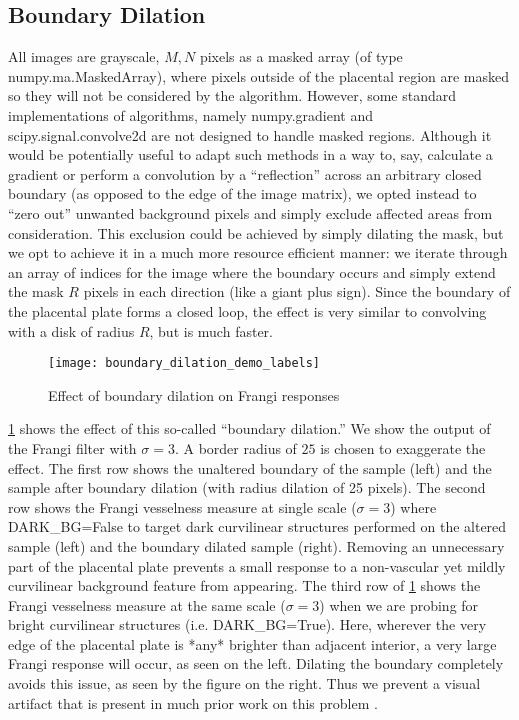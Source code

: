     \subsection{Boundary Dilation} \label{sec:boundary-dilation}
    
    All images are grayscale, $M,N$ pixels as a masked array (of type
    \textrm{numpy.ma.MaskedArray}), where pixels outside of the placental region are masked so they will not be considered by the algorithm. However, some standard
    implementations of algorithms, namely \textrm{numpy.gradient and scipy.signal.convolve2d} are not designed to handle masked regions. Although it would be potentially useful to adapt such methods in a way to, say, calculate a gradient or perform a convolution by a ``reflection'' across an arbitrary closed boundary (as opposed to the edge of the image matrix), we opted instead to ``zero out'' unwanted background pixels and simply exclude affected areas from consideration. This exclusion could be achieved by
    simply dilating the mask, but we opt to achieve it in a much more resource efficient manner: we iterate through an array of indices for the image where the boundary occurs and simply extend the mask $R$ pixels in each direction (like a giant plus sign). Since the boundary of the placental plate forms a closed loop, the effect is very similar to convolving with a disk of radius $R$, but is much faster.
    
    \begin{figure} 
        \texttt{[image: boundary\_dilation\_demo\_labels]}
        \caption{Effect of boundary dilation on Frangi responses}
        \label{fig:boundary-demo}
    \end{figure}
    
    \cref{fig:boundary-demo} shows the effect of this so-called ``boundary dilation.'' 
    We show the output of the Frangi filter with $\sigma=3$. A border radius of $25$ is chosen to exaggerate the effect.
    The first row shows the unaltered boundary of the sample (left) and
        the sample after boundary dilation (with radius dilation of 25 pixels).
    The second row shows the Frangi vesselness measure at single scale ($\sigma=3$) where \textrm{DARK\_BG=False} to target dark curvilinear structures performed on the altered sample (left) and the boundary dilated sample (right). Removing an unnecessary part of
    the placental plate prevents a small response to a non-vascular yet mildly curvilinear
    background feature from appearing.
    The third row of \cref{fig:boundary-demo} shows the Frangi vesselness measure at the same scale ($\sigma=3$) when we are probing for bright curvilinear structures (i.e.
    \textrm{DARK\_BG=True}). Here, wherever the very edge of the placental plate is *any* brighter than adjacent interior, a very large Frangi response will occur, as seen on the left. Dilating the boundary completely avoids this issue, as seen by the figure on the right. Thus we prevent a visual artifact that is present in much prior work on this problem \autocite{huynh2013filter,almoussa-ucla-reu}.

